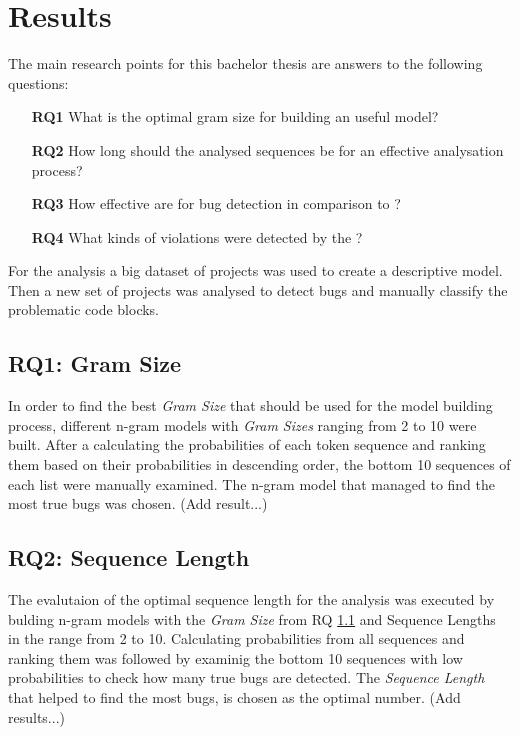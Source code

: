\chapter{Results}\label{chap:results}
The main research points for this bachelor thesis are answers to the following questions:
\begin{itemize}
\item[\textbf{RQ1}] What is the optimal gram size for building an useful model?
\item[\textbf{RQ2}] How long should the analysed sequences be for an effective analysation process?
\item[\textbf{RQ3}] How effective are \ngram{} for bug detection in comparison to \litterbox{}?
\item[\textbf{RQ4}] What kinds of violations were detected by the \ngram{}?
\end{itemize}
For the analysis a big dataset of  projects was used to create a descriptive model. Then a new set of projects was analysed to detect bugs and manually classify the problematic code blocks.

\section{RQ1: Gram Size}\label{sec:gram_size}
In order to find the best \emph{Gram Size} that should be used for the model building process, different n-gram models with \emph{Gram Sizes} ranging from 2 to 10 were built. After a calculating the probabilities of each token sequence and ranking them based on their probabilities in descending order, the bottom 10 sequences of each list were manually examined. The n-gram model that managed to find the most true bugs was chosen. (Add result...)

\section{RQ2: Sequence Length}\label{sec:sequence_length}
The evalutaion of the optimal sequence length for the analysis was executed by bulding n-gram models with the \emph{Gram Size} from RQ \ref{sec:gram_size} and {Sequence Lengths} in the range from 2 to 10. Calculating probabilities from all sequences and ranking them was followed by examinig the bottom 10 sequences with low probabilities to check how many true bugs are detected. The \emph{Sequence Length} that helped to find the most bugs, is chosen as the optimal number. (Add results...)

